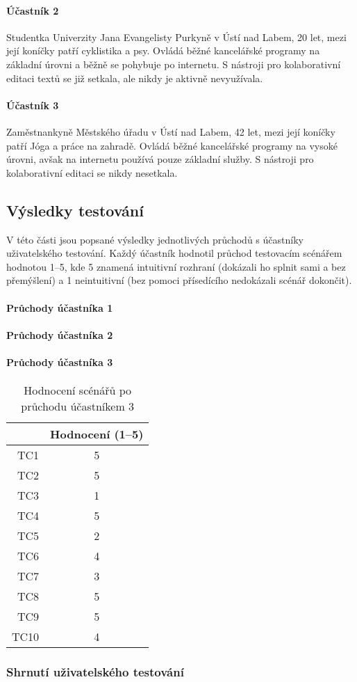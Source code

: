 \paragraph{Účastník 2}
Studentka Univerzity Jana Evangelisty Purkyně v Ústí nad Labem, 20 let, mezi její koníčky patří cyklistika a psy.
Ovládá běžné kancelářské programy na základní úrovni a běžně se pohybuje po internetu.
S nástroji pro kolaborativní editaci textů se již setkala, ale nikdy je aktivně nevyužívala.

\paragraph{Účastník 3}
Zaměstnankyně Městského úřadu v Ústí nad Labem, 42 let, mezi její koníčky patří Jóga a práce na zahradě.
Ovládá běžné kancelářské programy na vysoké úrovni, avšak na internetu používá pouze základní služby.
S nástroji pro kolaborativní editaci se nikdy nesetkala.

\subsection{Výsledky testování}

V této části jsou popsané výsledky jednotlivých průchodů s účastníky uživatelského testování.
Každý účastník hodnotil průchod testovacím scénářem hodnotou 1--5, kde 5 znamená intuitivní rozhraní (dokázali ho splnit sami a bez přemýšlení) a 1 neintuitivní (bez pomoci přísedícího nedokázali scénář dokončit).

\paragraph{Průchody účastníka 1}

\paragraph{Průchody účastníka 2}

\paragraph{Průchody účastníka 3}


\begin{table}[ht!]
    \centering
    \caption{Hodnocení scénářů po průchodu účastníkem 3}
    \label{tab:poPrůchoduÚčastníkem3}
    \begin{tabular}{r|c}
        & Hodnocení (1--5) \\ \hline
        TC1 & 5 \\
        TC2 & 5 \\
        TC3 & 1 \\
        TC4 & 5 \\
        TC5 & 2 \\
        TC6 & 4 \\
        TC7 & 3 \\
        TC8 & 5 \\
        TC9 & 5 \\
        TC10 & 4 \\
    \end{tabular}
\end{table}

\subsubsection{Shrnutí uživatelského testování}

